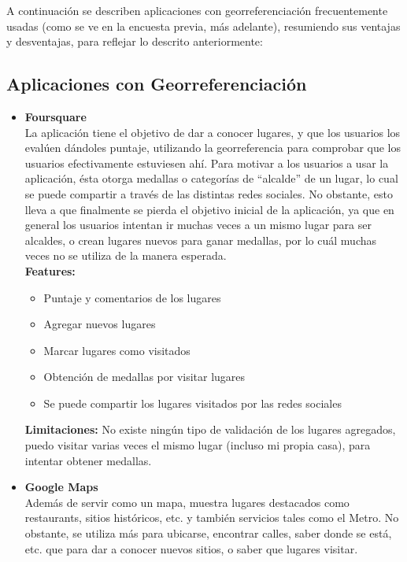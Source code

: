 \documentclass[10pt,letterpaper]{article}
\begin{document}
A continuación se describen aplicaciones con georreferenciación frecuentemente usadas (como se ve en la encuesta previa, más adelante), resumiendo sus ventajas y desventajas, para reflejar lo descrito anteriormente:\\

\subsection{Aplicaciones con Georreferenciación}

\begin{itemize}
 
\item \textbf{Foursquare}\\

La aplicación tiene el objetivo de dar a conocer lugares, y que los usuarios los evalúen dándoles puntaje, utilizando la georreferencia para comprobar que los usuarios efectivamente estuviesen ahí. Para motivar a los usuarios a usar la aplicación, ésta otorga medallas o categorías de “alcalde” de un lugar, lo cual se puede compartir a través de las distintas redes sociales. No obstante, esto lleva a que finalmente se pierda el objetivo inicial de la aplicación, ya que en general los usuarios intentan ir muchas veces a un mismo lugar para ser alcaldes, o crean lugares nuevos para ganar medallas, por lo cuál muchas veces no se utiliza de la manera esperada.\\

\textbf{Features:}\\
\begin{itemize}
\item Puntaje y comentarios de los lugares
\item Agregar nuevos lugares
\item Marcar lugares como visitados
\item Obtención de medallas por visitar lugares
\item Se puede compartir los lugares visitados por las redes sociales
\end{itemize}

\textbf{Limitaciones:} No existe ningún tipo de validación de los lugares agregados, puedo visitar varias veces el mismo lugar (incluso mi propia casa), para intentar obtener medallas.

\item \textbf{Google Maps}\\

Además de servir como un mapa, muestra lugares destacados como restaurants, sitios históricos, etc. y también servicios tales como el Metro. No obstante, se utiliza más para ubicarse, encontrar calles, saber donde se está, etc. que para dar a conocer nuevos sitios, o saber que lugares visitar.\\


\end{itemize}
\end{document}
